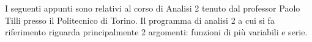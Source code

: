
I seguenti appunti sono relativi al corso di Analisi 2 tenuto dal professor Paolo Tilli presso il Politecnico di Torino.
Il programma di analisi 2 a cui si fa riferimento riguarda principalmente 2 argomenti: funzioni di più variabili e serie.


